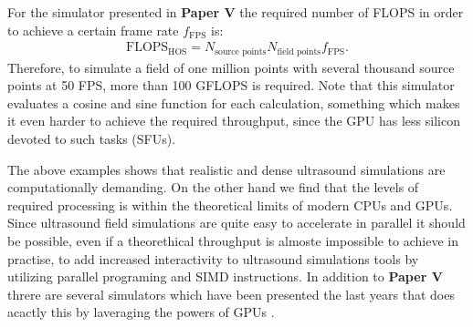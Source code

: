 For the simulator presented in \textbf{Paper V} the required number of FLOPS in order to achieve a certain frame rate $f_{\text{FPS}}$ is:
\begin{align}
\text{FLOPS}_{\text{HOS}} = N_{\text{source points}}N_{\text{field points}}f_{\text{FPS}}.
\end{align}
Therefore, to simulate a field of one million points with several thousand source points at 50 FPS, more than 100 GFLOPS is required. Note that this simulator evaluates a cosine and sine function for each calculation, something which makes it even harder to achieve the required throughput, since the GPU has less silicon devoted to such tasks (SFUs).

The above examples shows that realistic and dense ultrasound simulations are computationally demanding. On the other hand we find that the levels of required processing is within the theoretical limits of modern CPUs and GPUs. Since ultrasound field simulations are quite easy to accelerate in parallel it should be possible, even if a theorethical throughput is almoste impossible to achieve in practise, to add increased interactivity to ultrasound simulations tools by utilizing parallel programing and SIMD instructions. In addition to \textbf{Paper V} threre are several simulators which have been presented the last years that does acactly this by laveraging the powers of GPUs \cite{Gjerald2012, Reichl2009, Hlawitschka2011}.
			
\endinput
